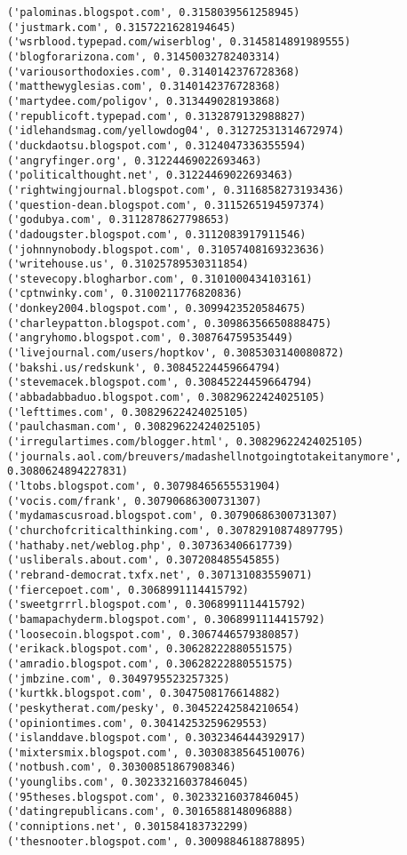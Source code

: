 \documentclass[11pt]{article}
\begin{document}
\begin{Verbatim}[commandchars=\\\{\}]
('palominas.blogspot.com', 0.3158039561258945)
('justmark.com', 0.3157221628194645)
('wsrblood.typepad.com/wiserblog', 0.3145814891989555)
('blogforarizona.com', 0.31450032782403314)
('variousorthodoxies.com', 0.3140142376728368)
('matthewyglesias.com', 0.3140142376728368)
('martydee.com/poligov', 0.313449028193868)
('republicoft.typepad.com', 0.3132879132988827)
('idlehandsmag.com/yellowdog04', 0.31272531314672974)
('duckdaotsu.blogspot.com', 0.3124047336355594)
('angryfinger.org', 0.31224469022693463)
('politicalthought.net', 0.31224469022693463)
('rightwingjournal.blogspot.com', 0.3116858273193436)
('question-dean.blogspot.com', 0.3115265194597374)
('godubya.com', 0.3112878627798653)
('dadougster.blogspot.com', 0.3112083917911546)
('johnnynobody.blogspot.com', 0.31057408169323636)
('writehouse.us', 0.31025789530311854)
('stevecopy.blogharbor.com', 0.3101000434103161)
('cptnwinky.com', 0.3100211776820836)
('donkey2004.blogspot.com', 0.3099423520584675)
('charleypatton.blogspot.com', 0.30986356650888475)
('angryhomo.blogspot.com', 0.308764759535449)
('livejournal.com/users/hoptkov', 0.3085303140080872)
('bakshi.us/redskunk', 0.30845224459664794)
('stevemacek.blogspot.com', 0.30845224459664794)
('abbadabbaduo.blogspot.com', 0.30829622424025105)
('lefttimes.com', 0.30829622424025105)
('paulchasman.com', 0.30829622424025105)
('irregulartimes.com/blogger.html', 0.30829622424025105)
('journals.aol.com/breuvers/madashellnotgoingtotakeitanymore', 0.3080624894227831)
('ltobs.blogspot.com', 0.30798465655531904)
('vocis.com/frank', 0.30790686300731307)
('mydamascusroad.blogspot.com', 0.30790686300731307)
('churchofcriticalthinking.com', 0.30782910874897795)
('hathaby.net/weblog.php', 0.307363406617739)
('usliberals.about.com', 0.307208485545855)
('rebrand-democrat.txfx.net', 0.307131083559071)
('fiercepoet.com', 0.3068991114415792)
('sweetgrrrl.blogspot.com', 0.3068991114415792)
('bamapachyderm.blogspot.com', 0.3068991114415792)
('loosecoin.blogspot.com', 0.3067446579380857)
('erikack.blogspot.com', 0.30628222880551575)
('amradio.blogspot.com', 0.30628222880551575)
('jmbzine.com', 0.3049795523257325)
('kurtkk.blogspot.com', 0.3047508176614882)
('peskytherat.com/pesky', 0.30452242584210654)
('opiniontimes.com', 0.30414253259629553)
('islanddave.blogspot.com', 0.3032346444392917)
('mixtersmix.blogspot.com', 0.3030838564510076)
('notbush.com', 0.30300851867908346)
('younglibs.com', 0.30233216037846045)
('95theses.blogspot.com', 0.30233216037846045)
('datingrepublicans.com', 0.3016588148096888)
('conniptions.net', 0.301584183732299)
('thesnooter.blogspot.com', 0.3009884618878895)

\end{Verbatim}
\end{document}
